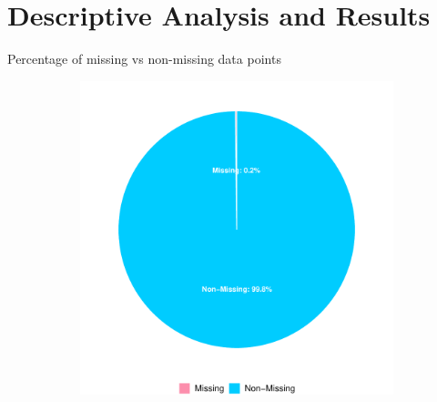 \documentclass[10pt]{beamer}
\begin{document}
\section{Descriptive Analysis and Results}
\begin{frame}{Percentage of missing vs non-missing data points}
\begin{figure}
\begin{subfigure}[b]{0.6\textheight}
\includegraphics{S_E_Ampah_QRE-missing-data-visualization}
\end{subfigure}
\end{figure}
\end{frame}
\end{document}
